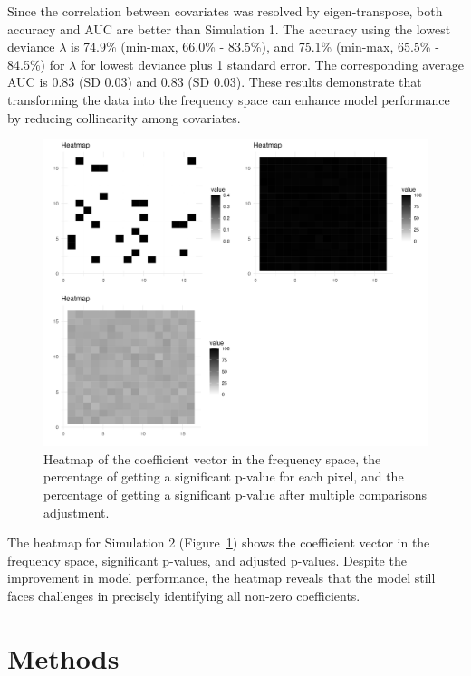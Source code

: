 \documentclass[12pt]{article}
\begin{document}
Since the correlation between covariates was resolved by eigen-transpose, both accuracy and AUC are better than Simulation 1. The accuracy using the lowest deviance \(\lambda\) is 74.9\% (min-max, 66.0\% - 83.5\%), and 75.1\% (min-max, 65.5\% - 84.5\%) for \(\lambda\) for lowest deviance plus 1 standard error. The corresponding average AUC is 0.83 (SD 0.03) and 0.83 (SD 0.03). These results demonstrate that transforming the data into the frequency space can enhance model performance by reducing collinearity among covariates.

\begin{figure}[H]
  \centering
  \includegraphics[width=\textwidth]{../Figures/sim2_heatmap.png}
  \caption{Heatmap of the coefficient vector in the frequency space, the percentage of getting a significant p-value for each pixel, and the percentage of getting a significant p-value after multiple comparisons adjustment.}
  \label{fig:sim2_heatmap}
\end{figure}

The heatmap for Simulation 2 (Figure~\ref{fig:sim2_heatmap}) shows the coefficient vector in the frequency space, significant p-values, and adjusted p-values. Despite the improvement in model performance, the heatmap reveals that the model still faces challenges in precisely identifying all non-zero coefficients.

\clearpage

\section*{Methods}
\end{document}
